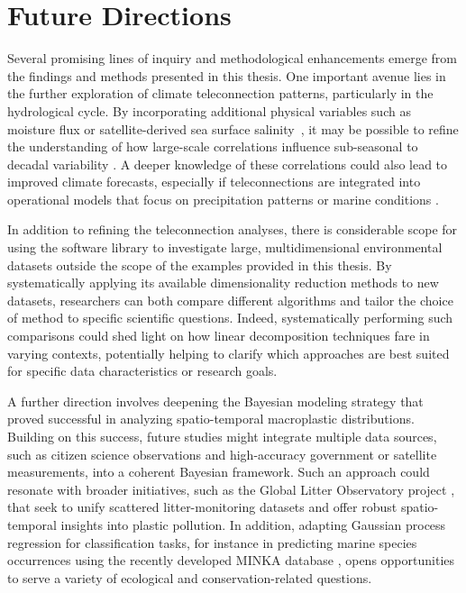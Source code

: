 
\section*{Future Directions}
Several promising lines of inquiry and methodological enhancements emerge from the findings and methods presented in this thesis. One important avenue lies in the further exploration of climate teleconnection patterns, particularly in the hydrological cycle. By incorporating additional physical variables such as moisture flux or satellite-derived sea surface salinity~\cite{reul_sea_2020,olmedo_increasing_2022}, it may be possible to refine the understanding of how large-scale correlations influence sub-seasonal to decadal variability \cite[e.g.][]{ballabrerapoy_potential_2002,rathore_improving_2021,li_skillful_2022}. A deeper knowledge of these correlations could also lead to improved climate forecasts, especially if teleconnections are integrated into operational models that focus on precipitation patterns or marine conditions \cite{li_skillful_2022,straaten_correcting_2023}.

In addition to refining the teleconnection analyses, there is considerable scope for using the  software library to investigate large, multidimensional environmental datasets outside the scope of the examples provided in this thesis. By systematically applying its available dimensionality reduction methods to new datasets, researchers can both compare different algorithms and tailor the choice of method to specific scientific questions. Indeed, systematically performing such comparisons could shed light on how linear decomposition techniques fare in varying contexts, potentially helping to clarify which approaches are best suited for specific data characteristics or research goals.

A further direction involves deepening the Bayesian modeling strategy that proved successful in analyzing spatio-temporal macroplastic distributions. Building on this success, future studies might integrate multiple data sources, such as citizen science observations and high-accuracy government or satellite measurements, into a coherent Bayesian framework. Such an approach could resonate with broader initiatives, such as the Global Litter Observatory project \cite{marine_litter_lab_global_2021}, that seek to unify scattered litter-monitoring datasets and offer robust spatio-temporal insights into plastic pollution. In addition, adapting Gaussian process regression for classification tasks, for instance in predicting marine species occurrences using the recently developed MINKA database \cite{luna_reyes_evaluation_2022}, opens opportunities to serve a variety of ecological and conservation-related questions. 

